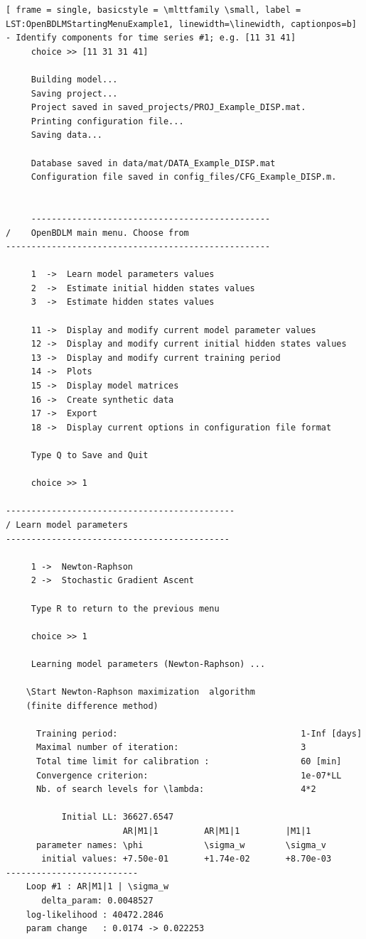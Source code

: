\documentclass[11pt,twoside]{article}
\begin{document}
\begin{lstlisting}[ frame = single, basicstyle = \mlttfamily \small, label = LST:OpenBDLMStartingMenuExample1, linewidth=\linewidth, captionpos=b]
- Identify components for time series #1; e.g. [11 31 41]
     choice >> [11 31 31 41]

     Building model...
     Saving project...
     Project saved in saved_projects/PROJ_Example_DISP.mat. 
     Printing configuration file...
     Saving data...

     Database saved in data/mat/DATA_Example_DISP.mat 
     Configuration file saved in config_files/CFG_Example_DISP.m. 
     
     
     ----------------------------------------------- 
/    OpenBDLM main menu. Choose from
----------------------------------------------------

     1  ->  Learn model parameters values 
     2  ->  Estimate initial hidden states values 
     3  ->  Estimate hidden states values 

     11 ->  Display and modify current model parameter values 
     12 ->  Display and modify current initial hidden states values 
     13 ->  Display and modify current training period 
     14 ->  Plots 
     15 ->  Display model matrices 
     16 ->  Create synthetic data 
     17 ->  Export
     18 ->  Display current options in configuration file format 

     Type Q to Save and Quit 

     choice >> 1
     
---------------------------------------------
/ Learn model parameters
--------------------------------------------

     1 ->  Newton-Raphson
     2 ->  Stochastic Gradient Ascent

     Type R to return to the previous menu

     choice >> 1

     Learning model parameters (Newton-Raphson) ...

    \Start Newton-Raphson maximization  algorithm 
    (finite difference method)

      Training period:                                    1-Inf [days]
      Maximal number of iteration:                        3
      Total time limit for calibration :                  60 [min]
      Convergence criterion:                              1e-07*LL
      Nb. of search levels for \lambda:                   4*2

           Initial LL: 36627.6547
                       AR|M1|1         AR|M1|1         |M1|1            
      parameter names: \phi            \sigma_w        \sigma_v         
       initial values: +7.50e-01       +1.74e-02       +8.70e-03       
--------------------------
    Loop #1 : AR|M1|1 | \sigma_w 
       delta_param: 0.0048527 
    log-likelihood : 40472.2846
    param change   : 0.0174 -> 0.022253


\end{lstlisting}
\end{document}
